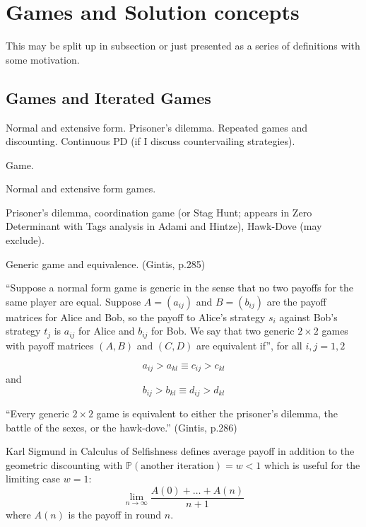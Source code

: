 \section{Games and Solution concepts}
This may be split up in subsection or just presented as a series of definitions with some motivation.

\subsection{Games and Iterated Games}
Normal and extensive form. Prisoner's dilemma. Repeated games and discounting. Continuous PD (if I discuss countervailing strategies).

\begin{definition}
Game.
\end{definition}
\begin{definition}
Normal and extensive form games.
\end{definition}

\begin{example}
Prisoner's dilemma, coordination game (or Stag Hunt; appears in Zero Determinant with Tags analysis in Adami and Hintze), Hawk-Dove (may exclude).
\end{example}
\begin{definition}
Generic game and equivalence. (Gintis, p.285)

``Suppose a normal form game is generic in the sense that no two payoffs for the same player are equal. Suppose $A = (a_{ij})$ and $B = (b_{ij})$ are the payoff matrices for Alice and Bob, so the payoff to Alice's strategy $s_i$ against Bob's strategy $t_j$ is $a_{ij}$ for Alice and $b_{ij}$ for Bob. We say that two generic $2 \times 2$ games with payoff matrices $(A, B)$ and $(C, D)$ are equivalent if'', for all $i, j = 1, 2$

\[
a_{ij} > a_{kl} \equiv c_{ij} > c_{kl}
\]
and
\[
b_{ij} > b_{kl} \equiv d_{ij} > d_{kl}
\]


\end{definition}

\begin{proposition}
``Every generic $2 \times 2$ game is equivalent to either the prisoner's dilemma, the battle of the sexes, or the hawk-dove.'' (Gintis, p.286)
\end{proposition}

Karl Sigmund in Calculus of Selfishness defines average payoff in addition to the geometric discounting with
$
\mathbb{P}(\mbox{another iteration}) = w < 1
$
which is useful for the limiting case $w=1$:
\[
\lim_{n \rightarrow \infty} \frac{A(0) + \dots + A(n)}{n+1}
\]
where $A(n)$ is the payoff in round $n$.
